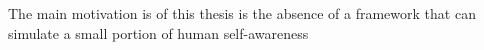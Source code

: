 \documentclass[a4paper]{article}
\title{}
\date{}
\begin{document}
    \maketitle
    
    The main motivation is of this thesis is the absence of a framework that can simulate a small portion of human self-awareness
    
    
    

\end{document}
